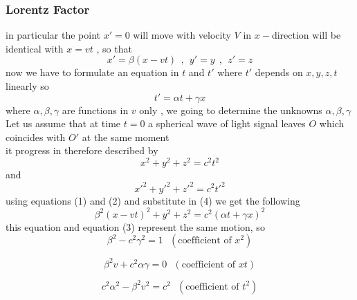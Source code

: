 \documentclass{article}
\begin{document}
\subsubsection{Lorentz Factor}
in particular the point $x' = 0$ will move with velocity $V$ in $x-$direction will be identical with $x=vt$ , so that 
\setcounter{equation}{0}
\begin{equation}
    x' = \beta(x-vt)
    \ \ , \ \
    y' = y 
    \ \ , \ \
    z' = z
\end{equation}
now we have to formulate an equation in $t$ and $t'$ where $t'$ depends on $x,y,z,t$ linearly so 
\begin{equation}
    t' = \alpha t + \gamma x
\end{equation}
where $\alpha , \beta , \gamma$ are functions in $v$ only , we going to determine the unknowns $\alpha , \beta , \gamma$\\
Let us assume that at time $t=0$ a spherical wave of light signal leaves $O$ which coincides with $O'$ at the same moment\\
it progress in therefore described by 
\begin{equation}
    x^2+y^2+z^2=c^2t^2
\end{equation}
and
\begin{equation}
    {x'}^2+{y'}^2+{z'}^2=c^2{t'}^2
\end{equation}
using equations (1) and (2) and substitute in (4)
we get the following
\begin{equation}
    \label{eq:5.1}
    \beta^2{(x-vt)}^2+y^2+z^2=c^2{(\alpha t + \gamma x)}^2
\end{equation}
this equation and equation (3) represent the same motion, so 
\begin{equation}
    \beta^2-c^2\gamma^2 = 1 \ \ \ (\text{coefficient of }x^2)
\end{equation}

\begin{equation}
    \beta^2 v +c^2\alpha\gamma = 0 \ \ \ (\text{coefficient of }xt)
\end{equation}

\begin{equation}
    c^2\alpha^2 - \beta^2 v^2  = c^2   \ \ \ (\text{coefficient of }t^2)
\end{equation}
\end{document}
